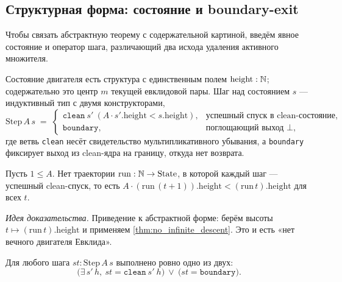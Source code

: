 \subsection{Структурная форма: состояние и boundary-exit}

Чтобы связать абстрактную теорему с содержательной картиной, введём явное состояние и оператор шага,
различающий два исхода удаления активного множителя.

\begin{definition}\label{thm:State}
Состояние двигателя есть структура с единственным полем $\mathrm{height}:\mathbb{N}$; содержательно это центр
$m$ текущей евклидовой пары. Шаг над состоянием $s$ --- индуктивный тип с двумя конструкторами,
\begin{equation}\label{eq:step}
  \mathrm{Step}\,A\,s \;=\;
  \begin{cases}
    \texttt{clean}\ s'\ (A\cdot s'.\mathrm{height} < s.\mathrm{height}), & \text{успешный спуск в clean-состояние,}\\[2pt]
    \texttt{boundary}, & \text{поглощающий выход } \bot,
  \end{cases}
\end{equation}
где ветвь \texttt{clean} несёт свидетельство мультипликативного убывания, а \texttt{boundary}
фиксирует выход из clean-ядра на границу, откуда нет возврата.
\end{definition}

\begin{theorem}\label{thm:no_perpetual_engine}
\green{}\; Пусть $1\le A$. Нет траектории $\mathrm{run}:\mathbb{N}\to\mathrm{State}$, в которой каждый шаг ---
успешный clean-спуск, то есть
$A\cdot(\mathrm{run}\,(t+1)).\mathrm{height} < (\mathrm{run}\,t).\mathrm{height}$ для всех $t$.
\end{theorem}

\emph{Идея доказательства.} Приведение к абстрактной форме: берём высоты
$t\mapsto(\mathrm{run}\,t).\mathrm{height}$ и применяем \cref{thm:no_infinite_descent}. Это и есть
«нет вечного двигателя Евклида».

\begin{theorem}\label{thm:boundary_dichotomy}
\green{}\; Для любого шага $st:\mathrm{Step}\,A\,s$ выполнено ровно одно из двух:
\begin{equation}\label{eq:dichotomy}
  \bigl(\exists\, s'\,h,\ st = \texttt{clean}\ s'\ h\bigr)\ \lor\ \bigl(st = \texttt{boundary}\bigr).
\end{equation}
\end{theorem}

